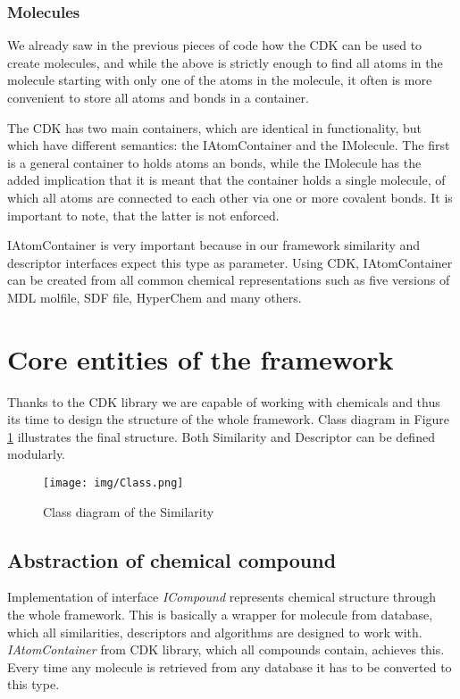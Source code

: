 \documentclass[thesis=M,english]{FITthesis}[2012/10/20]
\begin{document}
\subsubsection{Molecules}
We already saw in the previous pieces of code how the CDK can be used to create molecules, and while the above is strictly enough to find all atoms in the molecule starting with only one of the atoms in the molecule, it often is more convenient to store all atoms and bonds in a container. 

The CDK has two main containers, which are identical in functionality, but which have different semantics: the IAtomContainer and the IMolecule. The first is a general container to holds atoms an bonds, while the IMolecule has the added implication that it is meant that the container holds a single molecule, of which all atoms are connected to each other via one or more covalent bonds. It is important to note, that the latter is not enforced.\cite{cdk}

IAtomContainer is very important because in our framework similarity and descriptor interfaces expect this type as parameter. Using CDK, IAtomContainer can be created from all common chemical representations such as five versions of MDL molfile, SDF file, HyperChem and many others.



\section{Core entities of the framework}
\label{coreEntit}
Thanks to the CDK library we are capable of working with chemicals and thus its time to design the structure of the whole framework. Class diagram in Figure \ref{fig:classDiagram} illustrates the final structure. Both Similarity and Descriptor can be defined modularly.

\begin{figure}
  \centering
  \texttt{[image: img/Class.png]}
  \caption{Class diagram of the Similarity}
  \label{fig:classDiagram}
\end{figure}

\subsection{Abstraction of chemical compound}
Implementation of interface \textit{ICompound} represents chemical structure through the whole framework. This is basically a wrapper for molecule from database, which all similarities, descriptors and algorithms are designed to work with. \textit{IAtomContainer} from CDK library, which all compounds contain, achieves this. Every time any molecule is retrieved from any database it has to be converted to this type.
\end{document}
